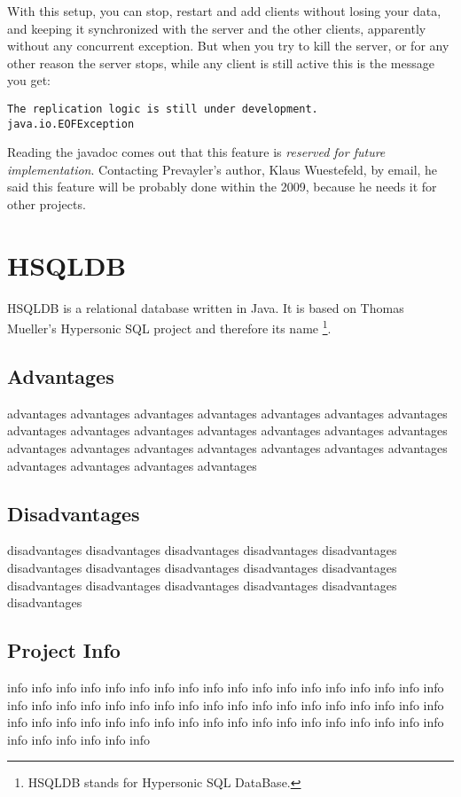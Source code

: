 			With this setup, you can stop, restart and add clients without losing your data, 
			and keeping it synchronized with the server and the other clients, 
			apparently without any concurrent exception. But when you try to kill the server, 
			or for any other reason the server stops, while any client is still active this is 
			the message you get: 
			\begin{lstlisting}
The replication logic is still under development.
java.io.EOFException
			\end{lstlisting}
			
			Reading the javadoc comes out that this feature is \emph{reserved for future implementation}. 
			Contacting Prevayler's author, Klaus Wuestefeld, by email, he said this feature 
			will be probably done within the 2009, because he needs it for other projects.
			
		\section{HSQLDB}
HSQLDB is a relational database written in Java. It is based on Thomas Mueller's Hypersonic SQL project and therefore its name \footnote{HSQLDB stands for Hypersonic SQL DataBase.}. 
		
			\subsection{Advantages}
			advantages advantages advantages advantages advantages 
			advantages advantages advantages advantages advantages 
			advantages advantages advantages advantages advantages 
			advantages advantages advantages advantages advantages 
			advantages advantages advantages advantages advantages 
			
			\subsection{Disadvantages}
			disadvantages disadvantages disadvantages disadvantages 
			disadvantages disadvantages disadvantages disadvantages 
			disadvantages disadvantages disadvantages disadvantages 
			disadvantages disadvantages disadvantages disadvantages 
			
			\subsection{Project Info}
			info info info info info info info info info info info info 
			info info info info info info info info info info info info 
			info info info info info info info info info info info info 
			info info info info info info info info info info info info 
			info info info info info info info info info info info info
			
